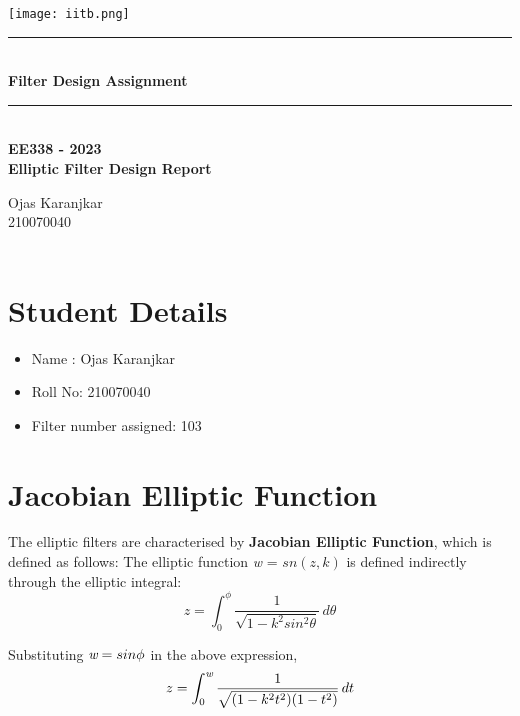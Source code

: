 \documentclass{article}
\begin{document}
\begin{titlepage}
\begin{center}
    \vspace*{\fill}
\texttt{[image: iitb.png]}\\
[4 cm]
    \rule{12.5cm}{0.75mm}\\
    \huge{\bfseries Filter Design Assignment}
    \rule{12.5cm}{0.75mm}\\
    [0.5cm]
   {\textbf {EE338 - 2023 \\
   Elliptic Filter Design Report}}\\
    [2.5cm]
\end{center}
\begin{flushleft}
   {\huge
    Ojas Karanjkar \\
    210070040 \\
     \\}
    \end{flushleft}
\end{titlepage}
\tableofcontents
\thispagestyle{empty}
\clearpage
{}

\newpage

\section{Student Details}
\begin{itemize}
    \item Name : Ojas Karanjkar
    \item Roll No: 210070040
    \item Filter number assigned: 103
\end{itemize}

\section{Jacobian Elliptic Function}

The elliptic filters are characterised by \textbf{Jacobian Elliptic Function}, which is defined as follows:
The elliptic function \emph{w} = $sn(z, k)$ is defined indirectly through the elliptic integral:\\
\begin{equation}
    z = \int _{0} ^{\phi} \frac{1}{\sqrt{1-k^{2}sin^{2}\theta}} \, d\theta
\end{equation}

Substituting $\emph{w} = sin \phi$ in the above expression,\\
\begin{equation}
    z = \int _{0} ^{\emph{w}} \frac{1}{\sqrt{(1-k^{2}t^{2})(1-t^{2})}} \, dt
\end{equation}
\end{document}
